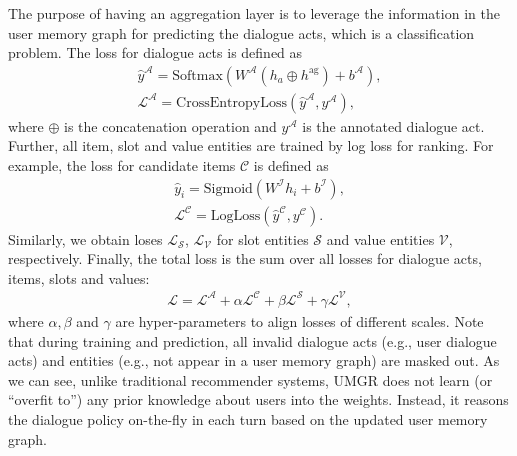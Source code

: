 The purpose of having an aggregation layer is to leverage the information in the user memory graph for predicting the dialogue acts, which is a classification problem. The loss for dialogue acts is defined as
\begin{equation}
\begin{split}
\hat{y}^{\mathcal{A}} = \text{Softmax}(W^\mathcal{A} (h_a \oplus h^\text{ag}) +b^\mathcal{A} ), \\
\mathcal{L}^{\mathcal{A}} = \text{CrossEntropyLoss}(\hat{y}^\mathcal{A}, y^\mathcal{A}),
\end{split}
\end{equation}
where $\oplus$ is the concatenation operation and $y^\mathcal{A}$ is the annotated dialogue act.
Further, all item, slot and value entities are trained by log loss for ranking. For example, the loss for candidate items $\mathcal{C}$ is defined as 
\begin{equation}
\begin{split}
\hat{y}_i = \text{Sigmoid}(W^\mathcal{I} h_i +b^{\mathcal{I}} ), \\
\mathcal{L}^\mathcal{C} = \text{LogLoss}(\hat{y}^\mathcal{C}, y^\mathcal{C}).
\end{split}
\end{equation}
Similarly, we obtain loses $\mathcal{L}_\mathcal{S}$, $\mathcal{L}_\mathcal{V}$ for slot entities $\mathcal{S}$ and value entities $\mathcal{V}$, respectively.
Finally, the total loss is the sum over all losses for dialogue acts, items, slots and values: 
\begin{equation}
\begin{split}
\mathcal{L} = \mathcal{L}^\mathcal{A} + \alpha\mathcal{L}^\mathcal{C} + \beta\mathcal{L}^\mathcal{S} + \gamma \mathcal{L}^\mathcal{V},
\end{split}
\end{equation}
where $\alpha, \beta$ and $\gamma$ are hyper-parameters to align losses of different scales.
Note that during training and prediction, all invalid dialogue acts (e.g., user dialogue acts) and entities (e.g., not appear in a user memory graph) are masked out.
As we can see, unlike traditional recommender systems, UMGR does not learn (or ``overfit to'') any prior knowledge about users into the weights. Instead, it reasons the dialogue policy on-the-fly in each turn based on the updated user memory graph.
